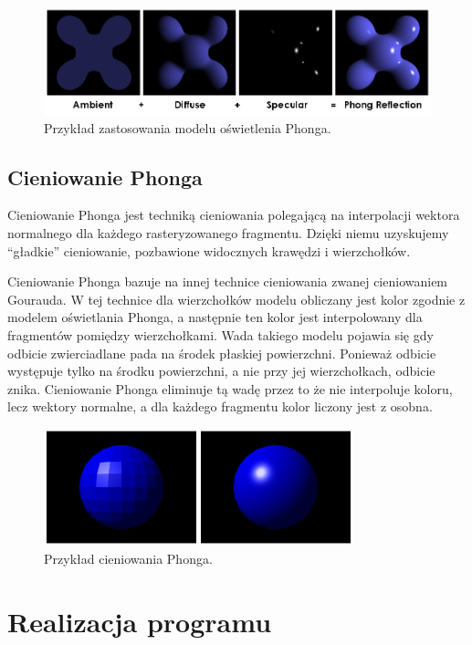 \documentclass[a4paper]{article}
\begin{document}
\begin{figure}[H]
    \centering
    \includegraphics[width=\textwidth]{phong_reflection_model}
    \caption{Przykład zastosowania modelu oświetlenia Phonga.}
\end{figure}

\subsection{Cieniowanie Phonga}

Cieniowanie Phonga jest techniką cieniowania polegającą na interpolacji wektora
normalnego dla każdego rasteryzowanego fragmentu. Dzięki niemu uzyskujemy
``gładkie'' cieniowanie, pozbawione widocznych krawędzi i wierzchołków.

Cieniowanie Phonga bazuje na innej technice cieniowania zwanej cieniowaniem
Gourauda. W tej technice dla wierzchołków modelu obliczany jest kolor zgodnie z
modelem oświetlania Phonga, a następnie ten kolor jest interpolowany dla
fragmentów pomiędzy wierzchołkami. Wada takiego modelu pojawia się gdy odbicie
zwierciadlane pada na środek płaskiej powierzchni. Ponieważ odbicie występuje
tylko na środku powierzchni, a nie przy jej wierzchołkach, odbicie znika.
Cieniowanie Phonga eliminuje tą wadę przez to że nie interpoluje koloru, lecz
wektory normalne, a dla każdego fragmentu kolor liczony jest z osobna.


\begin{figure}[H]
    \centering
    \includegraphics[width=0.8\textwidth]{phong_shading}
    \caption{Przykład cieniowania Phonga.}
\end{figure}

\section{Realizacja programu}
\end{document}
